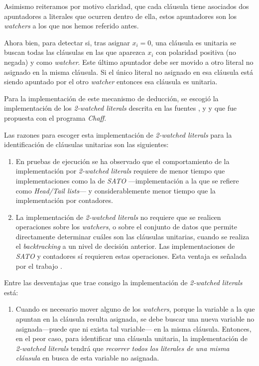 \documentclass[12pt,lettersize,oneside]{article}
\begin{document}
Asimismo reiteramos por motivo claridad, que cada cláusula tiene asociados dos
apuntadores a literales que ocurren dentro de ella, estos apuntadores son los
\emph{watchers} a los que nos hemos referido antes.

Ahora bien, para detectar si, tras asignar $x_i=0$, una cláusula
es unitaria se buscan todas las cláusulas en las que aparezca $x_i$ con
polaridad positiva (no negada) y como \emph{watcher}. Este último apuntador debe
ser movido a otro literal no asignado en la misma cláusula. Si el único literal
no asignado en esa cláusula está siendo apuntado por el otro \emph{watcher}
entonces esa cláusula es unitaria. 

Para la implementación de este mecanismo de deducción, se escogió la
implementación de los \emph{2-watched literals} descrita en las fuentes
\cite{Marques}, \cite{Zhang} y \cite{ZhangThesis} y que fue propuesta con el
programa \emph{Chaff}.



Las razones para escoger esta implementación de \emph{2-watched literals} para
la identificación de cláusulas unitarias son las siguientes:\vspace{-2.5mm}
\begin{enumerate}
\item En pruebas de ejecución\cite{Zhang} se ha observado que el comportamiento
  de la implementación por \emph{2-watched literals} requiere de menor tiempo
  que implementaciones como la de \emph{SATO} ---implementación a la que
  \cite{Zhang} se refiere como \emph{Head/Tail lists}--- y considerablemente
  menor tiempo que la implementación por contadores.
\item La implementación de \emph{2-watched literals} no requiere que se realicen
  operaciones sobre los \emph{watchers}, o sobre el conjunto de datos que
  permite directamente determinar cuáles son las cláusulas unitarias, cuando se
  realiza el \emph{backtracking} a un nivel de decisión anterior. Las
  implementaciones de \emph{SATO} y contadores sí requieren estas
  operaciones. Esta ventaja es señalada por el trabajo \cite{Marques}.
\end{enumerate}

Entre las desventajas que trae consigo la implementación de \emph{2-watched
  literals} está:\vspace{-2.5mm}
\begin{enumerate}
\item Cuando es necesario mover alguno de los \emph{watchers}, porque la variable
  a la que apuntan en la cláusula resulta asignada, se debe buscar una nueva
  variable no asignada---puede que ni exista tal variable--- en la misma
  cláusula. Entonces, en el peor caso, para identificar una cláusula unitaria,
  la implementación de \emph{2-watched literals} tendrá que \emph{recorrer todos
    los literales de una misma cláusula} en busca de esta variable no asignada.
\end{enumerate}
\end{document}
